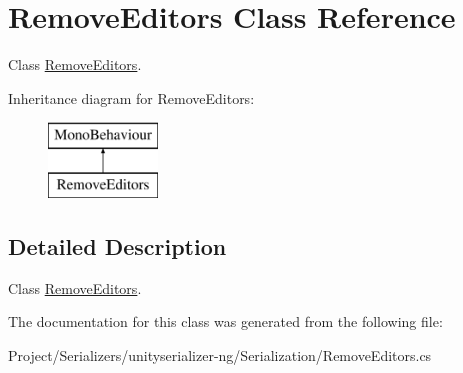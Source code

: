 \hypertarget{class_remove_editors}{}\section{Remove\+Editors Class Reference}
\label{class_remove_editors}


Class \hyperlink{class_remove_editors}{Remove\+Editors}.  


Inheritance diagram for Remove\+Editors\+:\begin{figure}[H]
\begin{center}
\leavevmode
\includegraphics[height=2.000000cm]{class_remove_editors}
\end{center}
\end{figure}


\subsection{Detailed Description}
Class \hyperlink{class_remove_editors}{Remove\+Editors}. 



The documentation for this class was generated from the following file\+:\begin{DoxyCompactItemize}
\item 
Project/\+Serializers/unityserializer-\/ng/\+Serialization/Remove\+Editors.\+cs\end{DoxyCompactItemize}
